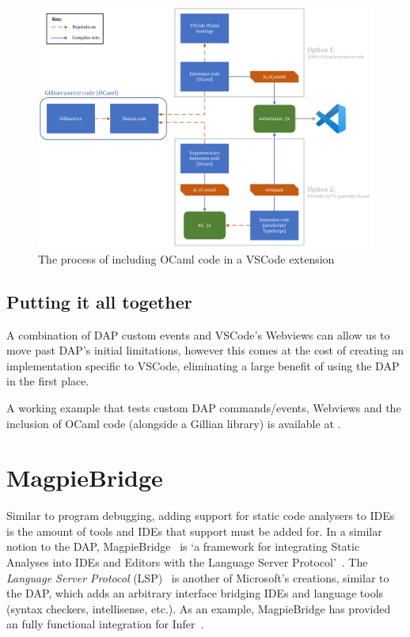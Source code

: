 \begin{figure}
  \center
  \includegraphics[width=650px]{img/vscode-extension-with-ocaml.png}
  \caption{The process of including OCaml code in a VSCode extension}
  \label{fig:vscode-extension-with-ocaml}
\end{figure}

\subsection{Putting it all together}

A combination of DAP custom events and VSCode's Webviews can allow us to move
past DAP's initial limitations, however this comes at the cost of creating an
implementation specific to VSCode, eliminating a large benefit of using the DAP
in the first place.

A working example that tests custom DAP commands/events, Webviews and the
inclusion of OCaml code (alongside a Gillian library) is available at
\cite{debugger-experiment}.

\section{MagpieBridge}

Similar to program debugging, adding support for static code analysers to IDEs
is the amount of tools and IDEs that support must be added for. In a similar
notion to the DAP, MagpieBridge~\cite{magpiebridge} is `a framework for
integrating Static Analyses into IDEs and Editors with the Language Server
Protocol'~\cite{magpiebridge-repo}. The \textit{Language Server Protocol}
(LSP)~\cite{lsp} is another of Microsoft's creations, similar to the DAP, which
adds an arbitrary interface bridging IDEs and language tools (syntax checkers,
intellisense, etc.). As an example, MagpieBridge has provided an fully
functional integration for Infer~\cite{infer-ide}.

